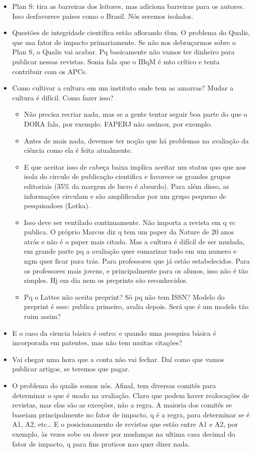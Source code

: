 \documentclass[11pt]{article}
\begin{document}
\begin{itemize}
\begin{itemize}
\item Plan S: tira as barreiras dos leitores, mas adiciona barreiras para os autores. Isso desfavorece países como o Brasil. Nós seremos isolados.
\item Questões de integridade científica estão aflorando tbm. O problema do Qualis, que usa fator de impacto primariamente. Se não nos debruçarmos sobre o Plan S, o Qualis vai acabar. Pq basicamente não vamos ter dinheiro para publicar nessas revistas. Sonia fala que o IBqM é mto crítico e tenta contribuir com os APCs.
\item Como cultivar a cultura em um instituto onde tem as amarras? Mudar a cultura é difícil. Como fazer isso?
\begin{itemize}
\item Não precisa recriar nada, mas se a gente tentar seguir boa parte do que o DORA fala, por exemplo. FAPERJ não assinou, por exemplo.
\item Antes de mais nada, devemos ter noção que há problemas na avaliação da ciência como ela é feita atualmente.
\item E que aceitar isso de cabeça baixa implica aceitar um status quo que nos isola do circulo de publicação cientifica e favorece os grandes grupos editoriais (35\% da margem de lucro é absurdo). Para além disso, as informações circulam e são amplificadas por um grupo pequeno de pesquisadoes (Lotka).
\item Isso deve ser ventilado continuamente. Não importa a revista em q vc publica. O próprio Marcus diz q tem um paper da Nature de 20 anos atrás e não é o paper mais citado. Mas a cultura é difícil de ser mudada, em grande parte pq a avaliação quer sumarizar tudo em um numero e ngm quer ficar para trás. Para professores que já estão estabelecidos. Para os professores mais jovens, e principalmente para os alunos, isso não é tão simples. Hj em dia nem os preprints são reconhecidos.
\item Pq o Lattes não aceita preprint? Só pq não tem ISSN? Modelo do preprint é esse: publica primeiro, avalia depois. Será que é um modelo tão ruim assim?
\end{itemize}
\item E o caso da ciencia básica é outro: e quando uma pesquisa básica é incorporada em patentes, mas não tem muitas citações?
\item Vai chegar uma hora que a conta não vai fechar. Daí como que vamos publicar artigos, se teremos que pagar.
\item O problema do qualis somos nós. Afinal, tem diversas comitês para determinar o que é usado na avaliação. Claro que podem haver realocações de revistas, mas elas são as exceções, não a regra. A maioria dos comitês se baseiam principalmente no fator de impacto, q é a regra, para determinar se é A1, A2, etc\ldots{} E o posicionamento de revistas que estão entre A1 e A2, por exemplo, às vezes sobe ou desce por mudanças na ultima casa decimal do fator de impacto, q para fins praticos nao quer dizer nada.

\end{itemize}
\end{itemize}
\end{document}
